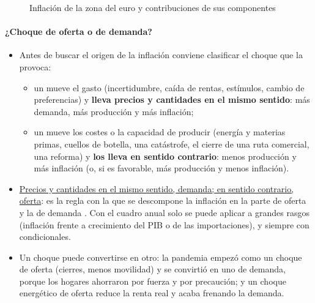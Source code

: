 \documentclass[11pt]{article}
\begin{document}
\begin{figure}[!htb]
\centering
\caption{Inflación de la zona del euro y contribuciones de sus componentes}\label{fig:iapc-zona-euro}
\end{figure}

\paragraph{¿Choque de oferta o de demanda?}
\begin{itemize}
\item Antes de buscar el origen de la inflación conviene clasificar el choque que la provoca:
  \begin{itemize}
  \item un  mueve el gasto (incertidumbre, caída de rentas, estímulos, cambio de preferencias) y \textbf{lleva precios y cantidades en el mismo sentido}: más demanda, más producción y más inflación;
  \item un  mueve los costes o la capacidad de producir (energía y materias primas, cuellos de botella, una catástrofe, el cierre de una ruta comercial, una reforma) y \textbf{los lleva en sentido contrario}: menos producción y más inflación (o, si es favorable, más producción y menos inflación).
  \end{itemize}
\item \uline{Precios y cantidades en el mismo sentido, demanda; en sentido contrario, oferta}: es la regla con la que se descompone la inflación en la parte de oferta y la de demanda \parencite{Shapiro2022Oferta}. Con el cuadro anual solo se puede aplicar a grandes rasgos (inflación frente a crecimiento del PIB o de las importaciones), y siempre con condicionales.
\item Un choque puede convertirse en otro: la pandemia empezó como un choque de oferta (cierres, menos movilidad) y se convirtió en uno de demanda, porque los hogares ahorraron por fuerza y por precaución; y un choque energético de oferta reduce la renta real y acaba frenando la demanda.
\end{itemize}
\end{document}
